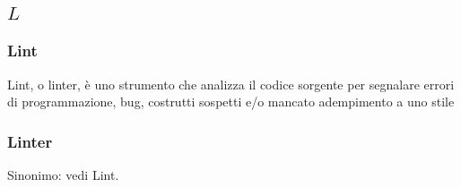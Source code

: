 \subsection*{\quad$L\quad$}
\subsubsection*{Lint}
Lint, o linter, è uno strumento che analizza il codice sorgente per segnalare errori di programmazione, bug, costrutti sospetti e/o mancato adempimento a uno stile
\subsubsection*{Linter}
Sinonimo: vedi Lint\glo.

